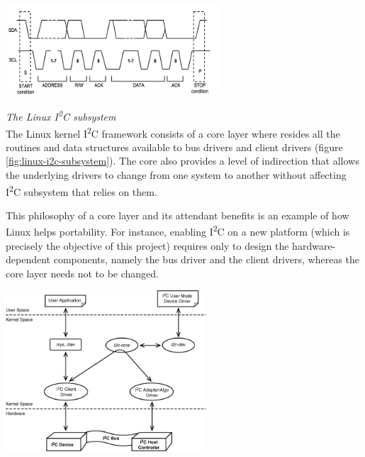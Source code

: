 \documentclass[a4paper,10pt]{article}
\makeatletter
\newenvironment{figurehere}{\def\@captype{figure}\vspace{2ex}}{\vspace{2ex}}
\newcommand{\icc}{I\textsuperscript{2}C }
\makeatother
\begin{document}
\begin{multicols}{2}
\begin{figurehere}
 \centering
 \includegraphics[width=8cm, height=3.3cm]{./figures/i2c-transaction.jpg}
 \caption{Sample \icc transaction (adapted from \emph{www.ermicro/blog}).}
 \label{fig:i2c-transaction}
\end{figurehere}

\emph{The Linux \icc subsystem}\\[6pt]
The Linux kernel \icc framework consists of a core layer where resides all the
routines and data structures available to bus drivers and client drivers
(figure \ref{fig:linux-i2c-subsystem}).
The core also provides a level of indirection that allows the underlying drivers
to change from one system to another without affecting \icc subsystem that
relies on them.

This philosophy of a core layer and its attendant benefits is an example of how
Linux helps portability. For instance, enabling \icc on a new platform (which is
precisely the objective of this project) requires only to design the
hardware-dependent components, namely the bus driver and the client drivers,
whereas the core layer needs not to be changed.

\begin{figurehere}
 \centering
 \includegraphics[width=7.5cm, height=6cm]{./figures/linux-i2c-subsystem.png}
 \caption{The Linux \icc subsystem (reprinted from \cite{venkateswaran2008eldd},
 		p. 236).}
 \label{fig:linux-i2c-subsystem}
\end{figurehere}




\end{multicols}
\end{document}
